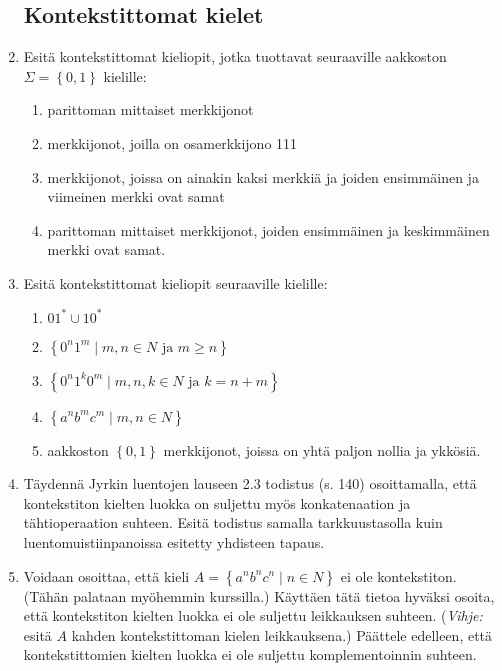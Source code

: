 \documentclass[a4paper,11pt]{article}
\newcommand{\set}[1]{{\left\{ #1 \right\}}}
\begin{document}
\begin{enumerate}
\subsection*{Kontekstittomat kielet}
\item
Esitä kontekstittomat kieliopit, jotka tuottavat seuraaville
aakkoston $\Sigma=\set{0,1}$ kielille:
\begin{enumerate}
\item
parittoman mittaiset merkkijonot
\item
merkkijonot, joilla on osamerkkijono 111
\item
merkkijonot, joissa on ainakin kaksi merkkiä ja joiden
ensimmäinen ja viimeinen merkki ovat samat
\item
parittoman mittaiset merkkijonot, joiden ensimmäinen ja
keskimmäinen merkki ovat samat.
\end{enumerate}

\item
Esitä kontekstittomat  kieliopit seuraaville kielille:
\begin{enumerate}
\item $01^\ast\cup10^\ast$
\item $\set{0^n1^m\mid\mbox{$m,n\in N$ ja $m\geq n$}}$
\item $\set{0^n1^k0^m\mid\mbox{$m,n,k\in N$ ja $k=n+m$}}$
\item $\set{a^n b^m c^m\mid m,n\in N}$
\item
aakkoston $\set{0,1}$ merkkijonot, joissa on yhtä paljon nollia ja
ykkösiä.
\end{enumerate}


\item
Täydennä Jyrkin luentojen lauseen 2.3 todistus (s. 140)
osoittamalla, että kontekstiton kielten luokka on suljettu
myös konkatenaation ja tähtioperaation suhteen.
Esitä todistus samalla tarkkuustasolla kuin luentomuistiinpanoissa
esitetty yhdisteen tapaus.


\item
Voidaan osoittaa, että kieli $A=\set{ a^n b^n c^n\mid n\in N}$
ei ole kontekstiton.
(Tähän palataan myöhemmin kurssilla.)
Käyttäen tätä tietoa hyväksi osoita, että
kontekstiton kielten luokka ei ole suljettu leikkauksen suhteen.
({\em Vihje:} esitä $A$ kahden kontekstittoman kielen leikkauksena.)
Päättele edelleen, että kontekstittomien kielten luokka
ei ole suljettu komplementoinnin suhteen.



\end{enumerate}
\end{document}
